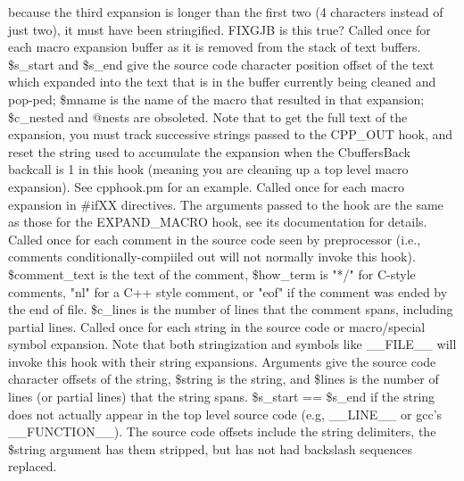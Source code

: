 because the third expansion is longer than the first two (4 characters instead of
just two), it must have been stringified. FIXGJB is this true?
Called once for each macro expansion buffer as it is removed 
from the stack of text buffers.  \$s\_\-start and \$s\_\-end give the source
code character position offset of the text which expanded into the text
that is in the buffer currently being cleaned and pop-ped;  \$mname is the
name of the macro that resulted in that expansion; \$c\_\-nested and @nests
are obsoleted.  Note that to get the full text of the expansion, you must
track successive strings passed to the CPP\_\-OUT hook, and reset the
string used to accumulate the expansion when the CbuffersBack backcall
is 1 in this hook (meaning you are cleaning up a top level macro expansion).
See cpphook.pm for an example.
Called once for each macro expansion in \#ifXX directives.  The arguments
passed to the hook are the same as those for the EXPAND\_\-MACRO hook, see its
documentation for details.
Called once for each comment in the source code seen by preprocessor (i.e.,
comments conditionally-compiiled out will not normally invoke this hook).
\$comment\_\-text is the text of the comment, \$how\_\-term is "*/" for C-style
comments, "nl" for a C++ style comment, or "eof" if the comment
was ended by the end of file.
\$c\_\-lines is the number of lines that the comment spans, including partial lines.
Called once for each string in the source code or macro/special symbol expansion.
Note that both stringization and symbols like \_\-\_\-FILE\_\-\_\- will invoke this hook
with their string expansions.
Arguments give the source code character offsets of the string, \$string is
the string, and \$lines is the number of lines (or partial lines) that the
string spans.  \$s\_\-start == \$s\_\-end if the string does not actually appear
in the top level source code (e.g, \_\-\_\-LINE\_\-\_\- or gcc's \_\-\_\-FUNCTION\_\-\_\-).
The source code offsets include the string delimiters, the \$string argument
has them stripped, but has not had backslash sequences replaced.
